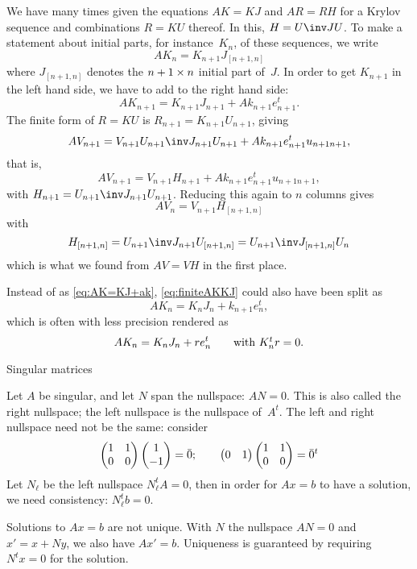 \documentclass[11pt]{artikel3}
\begin{document}
\begin{Outline}
We have many times given the equations $AK=KJ$ and $AR=RH$ for a
Krylov sequence and combinations $R=KU$ thereof.
In this, $H=\nobreak U\inv JU$.
To make a statement about initial parts, for instance~$K_n$,
of these sequences, we write
\begin{equation}
     AK_n=K_{n+1}J_{[n+1,n]}
    \label{eq:finiteAKKJ}\end{equation}
where $J_{[n+1,n]}$ denotes the $n+1\times\nobreak n$ initial part of~$J$.
In order to get $K_{n+1}$ in the left hand side, we have to add
to the right hand side:
\begin{equation}
     AK_{n+1}=K_{n+1}J_{n+1}+Ak_{n+1}e_{n+1}^t.
    \label{eq:AK=KJ+ak}\end{equation}
The finite form of $R=KU$ is $R_{n+1}=K_{n+1}U_{n+1}$, giving
\[ AV_{n+1}=V_{n+1}U_{n+1}\inv J_{n+1}U_{n+1}+Ak_{n+1}e_{n+1}^tu_{n+1n+1}, \]
that is,
\[ AV_{n+1}=V_{n+1}H_{n+1}+Ak_{n+1}e_{n+1}^tu_{n+1n+1}, \]
with $H_{n+1}=U_{n+1}\inv J_{n+1}U_{n+1}$.
Reducing this again to $n$ columns gives
\[ AV_n=V_{n+1}H_{[n+1,n]} \]
with
\[ H_{[n+1,n]} = U_{n+1}\inv J_{n+1}U_{[n+1,n]}
      =U_{n+1}\inv J_{[n+1,n]}U_{n} \]
which is what we found from $AV=VH$ in the first place.

Instead of as \eqref{eq:AK=KJ+ak}, \eqref{eq:finiteAKKJ} could 
also have been split as
\[ AK_n=K_nJ_n+k_{n+1}e_n^t, \]
which is often with less precision rendered as
\[ AK_n=K_nJ_n+re_n^t\qquad\hbox{with $K_n^tr=0$}. \]

 {Singular matrices}

Let $A$ be singular, and let $N$ span the nullspace:
$AN=0$. This is also called the right nullspace; the left nullspace is
the nullspace of~$A^t$. The left and right nullspace need not be the
same: consider
\[ \begin{pmatrix}1&1\cr 0&0\end{pmatrix}\begin{pmatrix}   1\cr-1\end{pmatrix}=\bar 0;\qquad
  \begin{pmatrix}0&1\end{pmatrix}\begin{pmatrix}    1&1\cr 0&0\end{pmatrix}=\bar 0^t
\]
Let $N_\ell$ be the left nullspace $N_\ell^tA=0$, then in order for
$Ax=b$ to have a solution, we need consistency:
$N_\ell^tb=0$.

Solutions to $Ax=b$ are not unique. With $N$ the nullspace $AN=0$ and
$x'=x+Ny$, we also have $Ax'=b$. Uniqueness is guaranteed by requiring
$N^tx=0$ for the solution.


\end{Outline}
\end{document}
